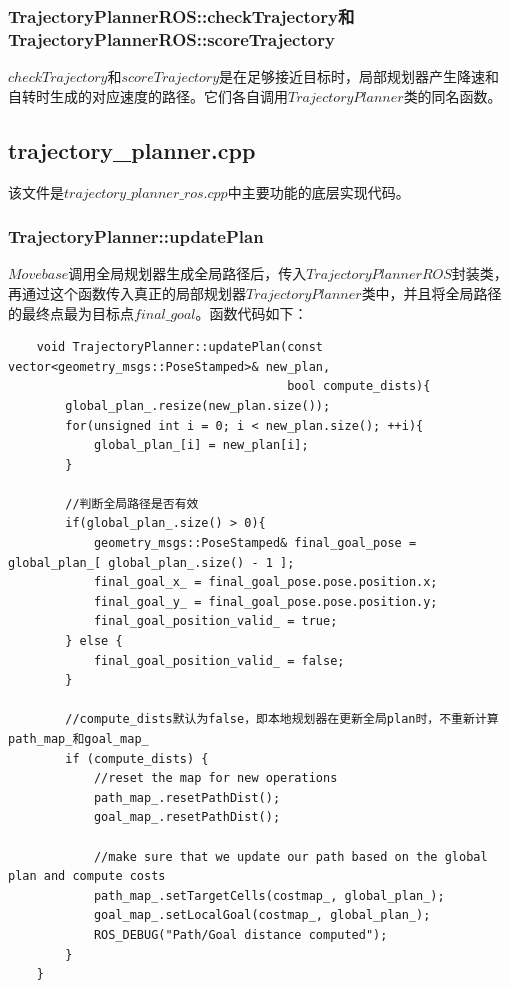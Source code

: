\documentclass[9pt, oneside]{book}
\begin{document}
\subsubsection{TrajectoryPlannerROS::checkTrajectory和TrajectoryPlannerROS::scoreTrajectory}

$checkTrajectory$和$scoreTrajectory$是在足够接近目标时，局部规划器产生降速和自转时生成的对应速度的路径。它们各自调用$TrajectoryPlanner$类的同名函数。

\subsection{trajectory\_planner.cpp}

该文件是$trajectory\_planner\_ros.cpp$中主要功能的底层实现代码。

\subsubsection{TrajectoryPlanner::updatePlan}

$Movebase$调用全局规划器生成全局路径后，传入$TrajectoryPlannerROS$封装类，再通过这个函数传入真正的局部规划器$TrajectoryPlanner$类中，并且将全局路径的最终点最为目标点$final\_goal$。函数代码如下：

\footnotesize
\begin{verbatim}
    void TrajectoryPlanner::updatePlan(const vector<geometry_msgs::PoseStamped>& new_plan, 
                                       bool compute_dists){
        global_plan_.resize(new_plan.size());
        for(unsigned int i = 0; i < new_plan.size(); ++i){
            global_plan_[i] = new_plan[i];
        }
    
        //判断全局路径是否有效
        if(global_plan_.size() > 0){
            geometry_msgs::PoseStamped& final_goal_pose = global_plan_[ global_plan_.size() - 1 ];
            final_goal_x_ = final_goal_pose.pose.position.x;
            final_goal_y_ = final_goal_pose.pose.position.y;
            final_goal_position_valid_ = true;
        } else {
            final_goal_position_valid_ = false;
        }
    
        //compute_dists默认为false，即本地规划器在更新全局plan时，不重新计算path_map_和goal_map_
        if (compute_dists) {
            //reset the map for new operations
            path_map_.resetPathDist();
            goal_map_.resetPathDist();
        
            //make sure that we update our path based on the global plan and compute costs
            path_map_.setTargetCells(costmap_, global_plan_);
            goal_map_.setLocalGoal(costmap_, global_plan_);
            ROS_DEBUG("Path/Goal distance computed");
        }
    }
\end{verbatim}
\end{document}
